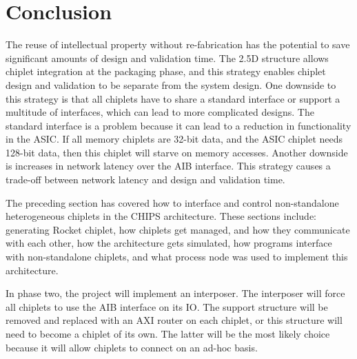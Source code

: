 \documentclass[../main.tex]{subfiles}
\begin{document}
\section{Conclusion}


The reuse of intellectual property without re-fabrication has the potential to save significant amounts of design and validation time. The 2.5D structure allows chiplet integration at the packaging phase, and this strategy enables chiplet design and validation to be separate from the system design. One downside to this strategy is that all chiplets have to share a standard interface or support a multitude of interfaces, which can lead to more complicated designs. The standard interface is a problem because it can lead to a reduction in functionality in the ASIC. If all memory chiplets are 32-bit data, and the ASIC chiplet needs 128-bit data, then this chiplet will starve on memory accesses.  Another downside is increases in network latency over the AIB interface. This strategy causes a trade-off between network latency and design and validation time. 

The preceding section has covered how to interface and control non-standalone heterogeneous chiplets in the CHIPS architecture. These sections include: generating Rocket chiplet, how chiplets get managed, and how they communicate with each other, how the architecture gets simulated, how programs interface with non-standalone chiplets, and what process node was used to implement this architecture. 

In phase two, the project will implement an interposer. The interposer will force all chiplets to use the AIB interface on its IO. The support structure will be removed and replaced with an AXI router on each chiplet, or this structure will need to become a chiplet of its own. The latter will be the most likely choice because it will allow chiplets to connect on an ad-hoc basis.
\end{document}
